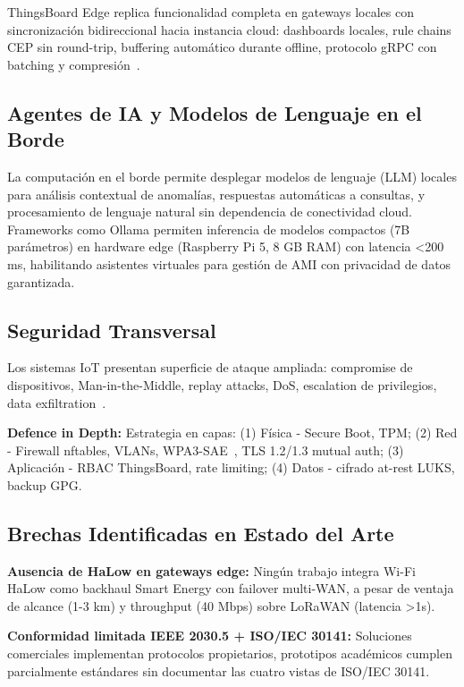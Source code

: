ThingsBoard Edge replica funcionalidad completa en gateways locales con sincronización bidireccional hacia instancia cloud: dashboards locales, rule chains CEP sin round-trip, buffering automático durante offline, protocolo gRPC con batching y compresión~\cite{gartnerMagicQuadrantIoT2024}.

\subsection{Agentes de IA y Modelos de Lenguaje en el Borde}

La computación en el borde permite desplegar modelos de lenguaje (LLM) locales para análisis contextual de anomalías, respuestas automáticas a consultas, y procesamiento de lenguaje natural sin dependencia de conectividad cloud. Frameworks como Ollama permiten inferencia de modelos compactos (7B parámetros) en hardware edge (Raspberry Pi 5, 8 GB RAM) con latencia <200 ms, habilitando asistentes virtuales para gestión de AMI con privacidad de datos garantizada.

\subsection{Seguridad Transversal}

Los sistemas IoT presentan superficie de ataque ampliada: compromise de dispositivos, Man-in-the-Middle, replay attacks, DoS, escalation de privilegios, data exfiltration~\cite{BlockchainBasedSecureAuthentication2025,nandalSECURITYRISKSIoT2025}.

\textbf{Defence in Depth:} Estrategia en capas: (1) Física - Secure Boot, TPM; (2) Red - Firewall nftables, VLANs, WPA3-SAE~\cite{IEEE80211ah2016}, TLS 1.2/1.3 mutual auth; (3) Aplicación - RBAC ThingsBoard, rate limiting; (4) Datos - cifrado at-rest LUKS, backup GPG.

\subsection{Brechas Identificadas en Estado del Arte}

\textbf{Ausencia de HaLow en gateways edge:} Ningún trabajo integra Wi-Fi HaLow como backhaul Smart Energy con failover multi-WAN, a pesar de ventaja de alcance (1-3 km) y throughput (40 Mbps) sobre LoRaWAN (latencia >1s).

\textbf{Conformidad limitada IEEE 2030.5 + ISO/IEC 30141:} Soluciones comerciales implementan protocolos propietarios, prototipos académicos cumplen parcialmente estándares sin documentar las cuatro vistas de ISO/IEC 30141.

